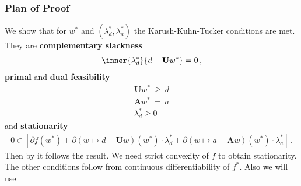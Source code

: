\subsubsection*{Plan of Proof}
We show that for $w^*$ and 
$
(\lambda_d^*,\lambda_a^*)
$
the Karush-Kuhn-Tucker conditions are met.
They are
\textbf{complementary slackness}
\begin{gather}
\inner
{\lambda_d^*}{d-\mathbf{U} w^*}
=
0
\,,
\end{gather}
\textbf{primal} and \textbf{dual feasibility}
\begin{gather}
  \label{primal_feas}
    \mathbf{U}w^*
    \ 
    \ge
    \ 
    d
    \\
    \nonumber
    \mathbf{A}w^*
    \ 
    =
    \ 
    a
  \\
  \label{dual_feas}
  \lambda_d^*\ge 0
\end{gather}
and 
\textbf{stationarity}
\begin{gather}
  \mathrm{0}
  \in
  [
  \partial
  f(w^*)
  +
    \partial
    \left( 
      w
      \mapsto
      d
      -
      \mathbf{U}w
    \right)
    (w^*)
    \cdot
    \lambda_d^*
    +
    \partial
    \left( 
      w
      \mapsto
      a
      -
      \mathbf{A}w
    \right)
    (w^*)
    \cdot
    \lambda_a^*
  ]
  \,.
\end{gather}
Then by \cite[Theorem~28.3]{Rockafellar1970}
it follows the result.
We need strict convexity of $f$ to obtain stationarity. The other
conditions follow from 
continuous differentiability of $f^*$.
Also we will use
